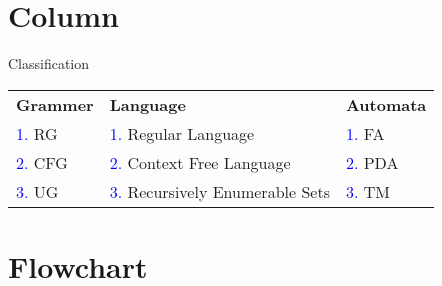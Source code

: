 \documentclass{beamer}
\begin{document}
\section{Column}

\begin{frame}{Classification}

    \begin{table}[]
        \begin{tabular}{l l l}
        \textbf{Grammer}& \textbf{Language}& \textbf{Automata}\\[2pt]
        \hspace{2mm} \textcolor{blue}{1.}  RG&\hspace{2mm}\textcolor{blue}{1.}  Regular Language &\hspace{2mm}\textcolor{blue}{1.}  FA  \\
        \hspace{2mm} \textcolor{blue}{2.}  CFG&\hspace{2mm}\textcolor{blue}{2.}  Context Free Language &\hspace{2mm}\textcolor{blue}{2.}  PDA   \\
        \hspace{2mm} \textcolor{blue}{3.}  UG&\hspace{2mm}\textcolor{blue}{3.}  Recursively Enumerable Sets &\hspace{2mm}\textcolor{blue}{3.}  TM 
         \end{tabular}
    \end{table}
\end{frame}


\section{Flowchart}
\end{document}
